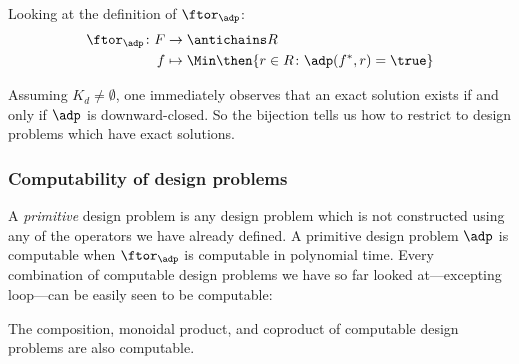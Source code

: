 Looking at the definition of $\ftor_\adp$:
\begin{equation}
    \begin{aligned}
        \ftor_\adp \colon F &\to \antichains R \\
        f &\mapsto \Min \then \{ r \in R \colon \adp(f^*, r) = \true \}
    \end{aligned}
\end{equation}

Assuming $K_d \neq \emptyset$, one immediately observes that an exact solution exists if and only if $\adp$ is downward-closed. So the bijection tells us how to restrict to design problems which have exact solutions.  %

\subsubsection{Computability of design problems}

A \emph{primitive} design problem is any design problem which is not constructed using any of the operators we have already defined. A primitive design problem $\adp$ is computable when $\ftor_\adp$ is computable in polynomial time.
Every combination of computable design problems we have so far looked at---excepting loop---can be easily seen to be computable:

\begin{proposition}
    The composition, monoidal product, and coproduct of computable design problems are also computable.
\end{proposition}

